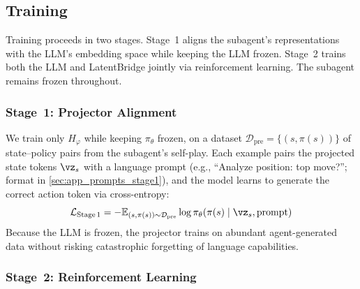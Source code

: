 \subsection{Training}
\label{sec:training}
Training proceeds in two stages. Stage~1 aligns the subagent's representations with the LLM's embedding space while keeping the LLM frozen. Stage~2 trains both the LLM and LatentBridge jointly via reinforcement learning. The subagent remains frozen throughout.

\subsubsection{Stage~1: Projector Alignment}
\label{sec:stage1}

We train only $H_\varphi$ while keeping $\pi_\theta$ frozen, on a dataset $\mathcal{D}_{\text{pre}} = \{(s, \pi(s))\}$ of state--policy pairs from the subagent's self-play. Each example pairs the projected state tokens $\vz_s$ with a language prompt (e.g., ``Analyze position: top move?''; format in \cref{sec:app_prompts_stage1}), and the model learns to generate the correct action token via cross-entropy:
\vspace{-2mm}
\[
\mathcal{L}_{\text{Stage\,1}} = -\mathbb{E}_{(s, \pi(s)) \sim \mathcal{D}_{\text{pre}}} \log \pi_\theta\!\left( \pi(s) \mid \vz_s, \text{prompt} \right)
\]
\vspace{-1mm}
Because the LLM is frozen, the projector trains on abundant agent-generated data without risking catastrophic forgetting of language capabilities.
\vspace{-2mm}
\subsubsection{Stage~2: Reinforcement Learning}
\label{sec:stage2}

